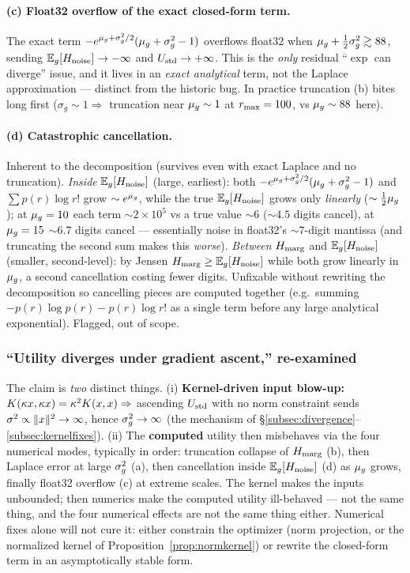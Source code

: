 \paragraph{(c) Float32 overflow of the exact closed-form term.} The exact term
$-e^{\mu_{g}+\sigma_{g}^{2}/2}(\mu_{g}+\sigma_{g}^{2}-1)$ overflows float32 when
$\mu_{g}+\tfrac12\sigma_{g}^{2}\gtrsim88$, sending $\mathbb{E}_{g}[H_{\mathrm{noise}}]\to-\infty$ and
$U_{\mathrm{std}}\to+\infty$. This is the \emph{only} residual ``$\exp$ can diverge'' issue,
and it lives in an \emph{exact analytical} term, not the Laplace approximation ---
distinct from the historic bug. In practice truncation (b) bites long first
($\sigma_g\sim1\Rightarrow$ truncation near $\mu_{g}\sim1$ at $r_{\max}=100$, vs
$\mu_{g}\sim88$ here).

\paragraph{(d) Catastrophic cancellation.} Inherent to the decomposition (survives
even with exact Laplace and no truncation). \emph{Inside} $\mathbb{E}_{g}[H_{\mathrm{noise}}]$
(large, earliest): both $-e^{\mu_{g}+\sigma_{g}^{2}/2}(\mu_{g}+\sigma_{g}^{2}-1)$ and $\sum p(r)\log r!$
grow $\sim e^{\mu_{g}}$, while the true $\mathbb{E}_{g}[H_{\mathrm{noise}}]$ grows only \emph{linearly}
($\sim\tfrac12\mu_{g}$); at $\mu_{g}=10$ each term $\sim2\times10^5$ vs a true value
$\sim6$ ($\sim4.5$ digits cancel), at $\mu_{g}=15$ $\sim6.7$ digits cancel ---
essentially noise in float32's $\sim7$-digit mantissa (and truncating the second
sum makes this \emph{worse}). \emph{Between} $H_{\mathrm{marg}}$ and $\mathbb{E}_{g}[H_{\mathrm{noise}}]$
(smaller, second-level): by Jensen $H_{\mathrm{marg}}\ge\mathbb{E}_{g}[H_{\mathrm{noise}}]$ while both grow
linearly in $\mu_{g}$, a second cancellation costing fewer digits. Unfixable without
rewriting the decomposition so cancelling pieces are computed together (e.g.\
summing $-p(r)\log p(r)-p(r)\log r!$ as a single term before any large analytical
exponential). Flagged, out of scope.

\subsubsection{``Utility diverges under gradient ascent,'' re-examined}
The claim is \emph{two} distinct things. (i) \textbf{Kernel-driven input blow-up:}
$K(\kappa x,\kappa x)=\kappa^2K(x,x)\Rightarrow$ ascending $U_{\mathrm{std}}$ with no norm
constraint sends $\sigma^{2}\propto\lVert x\rVert^2\to\infty$, hence $\sigma_{g}^{2}\to\infty$
(the mechanism of \S\ref{subsec:divergence}--\ref{subsec:kernelfixes}). (ii) The
\textbf{computed} utility then misbehaves via the four numerical modes, typically
in order: truncation collapse of $H_{\mathrm{marg}}$ (b), then Laplace error at large $\sigma_{g}^{2}$
(a), then cancellation inside $\mathbb{E}_{g}[H_{\mathrm{noise}}]$ (d) as $\mu_{g}$ grows, finally
float32 overflow (c) at extreme scales. The kernel makes the inputs unbounded;
then numerics make the computed utility ill-behaved --- not the same thing, and
the four numerical effects are not the same thing either. Numerical fixes alone
will not cure it: either constrain the optimizer (norm projection, or the
normalized kernel of Proposition~\ref{prop:normkernel}) or rewrite the closed-form
term in an asymptotically stable form.

